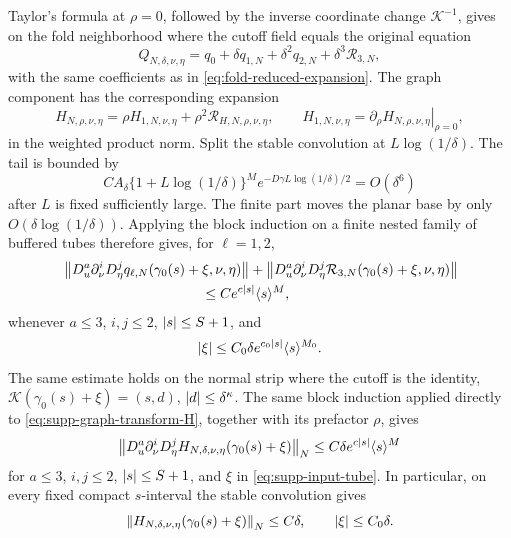 Taylor's formula at \(\rho=0\), followed by the inverse coordinate change
\(\mathcal K^{-1}\), gives on the fold neighborhood where the cutoff field
equals the original equation
\begin{equation}
 Q_{N,\delta,\nu,\eta}
 =q_0+\delta q_{1,N}+\delta^2q_{2,N}
      +\delta^3\mathcal R_{3,N},
 \label{eq:supp-reduced-expansion}
\end{equation}
with the same coefficients as in \cref{eq:fold-reduced-expansion}.  The graph
component has the corresponding expansion
\begin{equation}
 H_{N,\rho,\nu,\eta}
 =\rho H_{1,N,\nu,\eta}+\rho^2\mathcal R_{H,N,\rho,\nu,\eta},
 \qquad
 H_{1,N,\nu,\eta}
 =\left.\partial_\rho H_{N,\rho,\nu,\eta}\right|_{\rho=0},
 \label{eq:supp-first-graph-coefficient}
\end{equation}
in the weighted product norm.  Split
the stable convolution at \(L\log(1/\delta)\).  The tail is bounded by
\begin{equation}
 CA_\delta\{1+L\log(1/\delta)\}^M
 e^{-D\gamma L\log(1/\delta)/2}=O(\delta^6)
 \label{eq:supp-convolution-tail}
\end{equation}
after \(L\) is fixed sufficiently large.  The finite part moves the planar
base by only \(O(\delta\log(1/\delta))\).  Applying the block induction on
a finite nested family of buffered tubes therefore gives, for
\(\ell=1,2\),
\begin{equation}
 \begin{split}
 &\norm{D_u^a\partial_\nu^iD_\eta^j
     q_{\ell,N}(\gamma_0(s)+\xi,\nu,\eta)}
 +\norm{D_u^a\partial_\nu^iD_\eta^j
     \mathcal R_{3,N}(\gamma_0(s)+\xi,\nu,\eta)}\\
 &\hspace{35mm}\le Ce^{c\abs s}\langle s\rangle^M,
 \end{split}
 \label{eq:supp-coefficient-envelope}
\end{equation}
whenever \(a\le3\), \(i,j\le2\), \(\left\lvert s\right\rvert\le S+1\),
and
\begin{equation}
 \left\lvert\xi\right\rvert\le C_0\delta e^{c_0\left\lvert s\right\rvert}\langle s\rangle^{M_0}.
 \label{eq:supp-input-tube}
\end{equation}
The same estimate holds on the normal strip where the cutoff is the identity,
\(\mathcal K(\gamma_0(s)+\xi)=(s,d)\), \(\left\lvert d\right\rvert\le\delta^\kappa\).
The same block induction applied directly to
\cref{eq:supp-graph-transform-H}, together with its prefactor \(\rho\), gives
\begin{equation}
 \left\lVert D_u^a\partial_\nu^iD_\eta^j
 H_{N,\delta,\nu,\eta}(\gamma_0(s)+\xi)\right\rVert_N
 \le C\delta e^{c\left\lvert s\right\rvert}\langle s\rangle^M
 \label{eq:supp-expanding-window-graph-bound}
\end{equation}
for \(a\le3\), \(i,j\le2\), \(\left\lvert s\right\rvert\le S+1\), and \(\xi\) in
\cref{eq:supp-input-tube}.  In particular, on every fixed compact
\(s\)-interval the stable convolution gives
\begin{equation}
 \left\lVert H_{N,\delta,\nu,\eta}(\gamma_0(s)+\xi)\right\rVert_N
 \le C\delta,\qquad \left\lvert\xi\right\rvert\le C_0\delta.
 \label{eq:supp-local-graph-size}
\end{equation}

